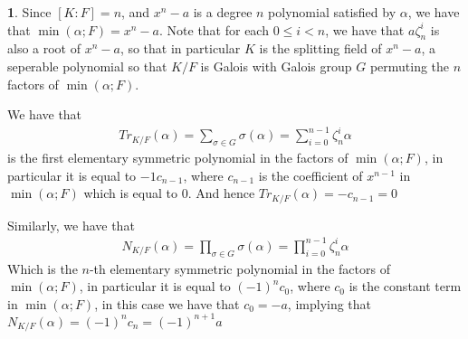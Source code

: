 \documentclass[11pt]{article}
\theoremstyle{definition}
\newtheorem{pb}{}
\begin{document}
    \begin{pb}
        Since \([K:F] = n\), and \(x^n - a\) is a degree \(n\) polynomial satisfied by \(\alpha\), we have that \(\min(\alpha;F) = x^n - a\). Note that for each \(0 \leq i < n\), we have that \(a\zeta_n^i\) is also a root of \(x^n - a\), so that in particular \(K\) is the splitting field of \(x^n - a\), a seperable polynomial so that \(K/F\) is Galois with Galois group \(G\) permuting the \(n\) factors of \(\min(\alpha;F)\).

        We have that 
        \begin{align*}
            Tr_{K/F}(\alpha) = \sum_{\sigma \in G} \sigma(\alpha) = \sum_{i=0}^{n-1} \zeta_n^i \alpha
        \end{align*}
        is the first elementary symmetric polynomial in the factors of \(\min(\alpha;F)\), in particular it is equal to \(-1 c_{n-1}\), where \(c_{n-1}\) is the coefficient of \(x^{n-1}\) in \(\min(\alpha;F)\) which is equal to \(0\). And hence \(Tr_{K/F}(\alpha) = -c_{n-1} = 0\)

        Similarly, we have that
        \begin{align*}
            N_{K/F}(\alpha) = \prod_{\sigma \in G}\sigma(\alpha) = \prod_{i=0}^{n-1}\zeta_n^i \alpha
        \end{align*}
        Which is the \(n\)-th elementary symmetric polynomial in the factors of \(\min(\alpha;F)\), in particular it is equal to \((-1)^nc_0\), where \(c_0\) is the constant term in \(\min(\alpha;F)\), in this case we have that \(c_0 = -a\), implying that \(N_{K/F}(\alpha) = (-1)^n c_n = (-1)^{n+1}a\)
    \end{pb}
\end{document}
